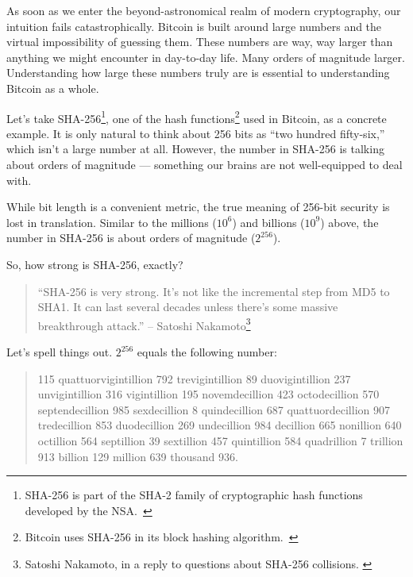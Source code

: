 As soon as we enter the beyond-astronomical realm of modern
cryptography, our intuition fails catastrophically. Bitcoin is built
around large numbers and the virtual impossibility of guessing them.
These numbers are way, way larger than anything we might encounter in
day-to-day life. Many orders of magnitude larger. Understanding how
large these numbers truly are is essential to understanding Bitcoin as a
whole.

Let's take SHA-256\footnote{SHA-256 is part of the SHA-2 family of cryptographic
hash functions developed by the NSA.~\cite{wiki:sha2}}, one of the hash
functions\footnote{Bitcoin uses SHA-256 in its block hashing
algorithm.~\cite{btcwiki:block-hashing}} used in Bitcoin, as a concrete example.
It is only natural to think about 256 bits as \enquote{two hundred fifty-six,} which
isn't a large number at all. However, the number in SHA-256 is talking about
orders of magnitude --- something our brains are not well-equipped to deal with.

While bit length is a convenient metric, the true meaning of 256-bit
security is lost in translation. Similar to the millions ($10^6$) and
billions ($10^9$) above, the number in SHA-256 is about orders of magnitude
($2^{256}$).

So, how strong is SHA-256, exactly?

\begin{samepage}\begin{quotation}
``SHA-256 is very strong. It's not like the incremental step from MD5
to SHA1. It can last several decades unless there's some massive
breakthrough attack.''
\flushright -- Satoshi Nakamoto\footnote{Satoshi Nakamoto, in a reply to questions about SHA-256 collisions. \cite{satoshi-sha256}}
\end{quotation}\end{samepage}

Let's spell things out. $2^{256}$ equals the following number:

\begin{samepage}\begin{quotation}
    115 quattuorvigintillion 792 trevigintillion 89 duovigintillion 237
    unvigintillion 316 vigintillion 195 novemdecillion 423 octodecillion 570
    septendecillion 985 sexdecillion 8 quindecillion 687 quattuordecillion 907
    tredecillion 853 duodecillion 269 undecillion 984 decillion 665 nonillion
    640 octillion 564 septillion 39 sextillion 457 quintillion 584 quadrillion 7
    trillion 913 billion 129 million 639 thousand 936.
\end{quotation}\end{samepage}

